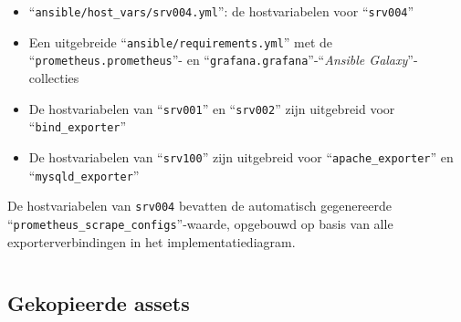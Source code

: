 \begin{itemize}
    \item ``\texttt{ansible/host\_vars/srv004.yml}'': de hostvariabelen voor ``\texttt{srv004}''
    \item Een uitgebreide ``\texttt{ansible/requirements.yml}'' met de \\``\texttt{prometheus.prometheus}''- en ``\texttt{grafana.grafana}''-``\emph{Ansible Galaxy}''-collecties
    \item De hostvariabelen van ``\texttt{srv001}'' en ``\texttt{srv002}'' zijn uitgebreid voor \\``\texttt{bind\_exporter}''
    \item De hostvariabelen van ``\texttt{srv100}'' zijn uitgebreid voor ``\texttt{apache\_exporter}'' en ``\texttt{mysqld\_exporter}''
\end{itemize}

De hostvariabelen van \texttt{srv004} bevatten de automatisch gegenereerde \\``\texttt{prometheus\_scrape\_configs}''-waarde, opgebouwd op basis van alle exporterverbindingen in het implementatiediagram.

\begin{codeblock}
    \inputminted{yaml}{../plantuml/output/infra_auto_lab_3_env/ansible/host_vars/srv004.yml}
    \caption[Gegenereerde \texttt{host\_vars/srv004.yml} voor testcase 3]{De door de converter gegenereerde hostvariabelen voor \texttt{srv004}. De \texttt{prometheus\_scrape\_configs}-waarde is automatisch samengesteld op basis van de pijlverbindingen in het implementatiediagram.}
    \label{code:hostvars_srv004}
\end{codeblock}

\subsection{Gekopieerde assets}%
\label{subsec:testcase3_assets}

